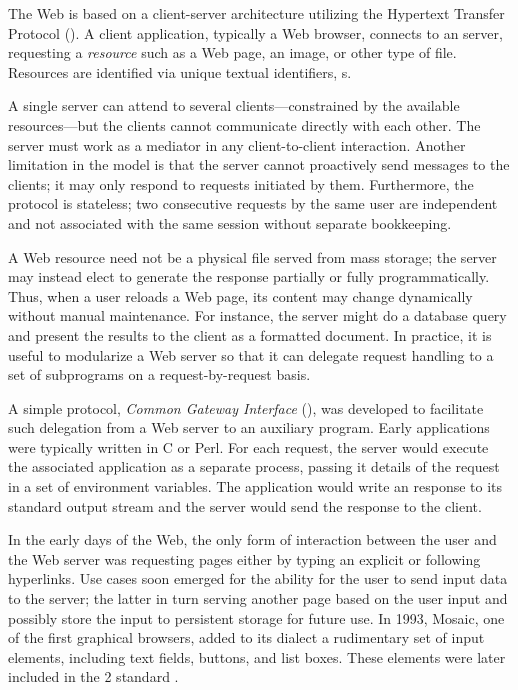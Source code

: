 The Web is based on a client-server architecture utilizing the Hypertext Transfer Protocol (). A client application, typically a Web browser, connects to an  server, requesting a \emph{resource} such as a Web page, an image, or other type of file. Resources are identified via unique textual identifiers, s. \cite{HTTP11}

A single server can attend to several clients---constrained by the available resources---but the clients cannot communicate directly with each other. The server must work as a mediator in any client-to-client interaction. Another limitation in the  model is that the server cannot proactively send messages to the clients; it may only respond to requests initiated by them. Furthermore, the protocol is stateless; two consecutive requests by the same user are independent and not associated with the same session without separate bookkeeping.

A Web resource need not be a physical file served from mass storage; the server may instead elect to generate the response partially or fully programmatically. Thus, when a user reloads a Web page, its content may change dynamically without manual maintenance. For instance, the server might do a database query and present the results to the client as a formatted  document. In practice, it is useful to modularize a Web server so that it can delegate request handling to a set of subprograms on a request-by-request basis. 

A simple protocol, \emph{Common Gateway Interface} (), was developed to facilitate such delegation from a Web server to an auxiliary program. Early  applications were typically written in C or Perl. For each request, the server would execute the associated  application as a separate process, passing it details of the request in a set of environment variables. The application would write an  response to its standard output stream and the server would send the response to the client. \cite{CGI11}

In the early days of the Web, the only form of interaction between the user and the Web server was requesting pages either by typing an explicit  or following hyperlinks. Use cases soon emerged for the ability for the user to send input data to the server; the latter in turn serving another page based on the user input and possibly store the input to persistent storage for future use. In \num{1993}, Mosaic, one of the first graphical browsers, added to its  dialect a rudimentary set of input elements, including text fields, buttons, and list boxes. These elements were later included in the  2 standard \cite{HTML20}.

